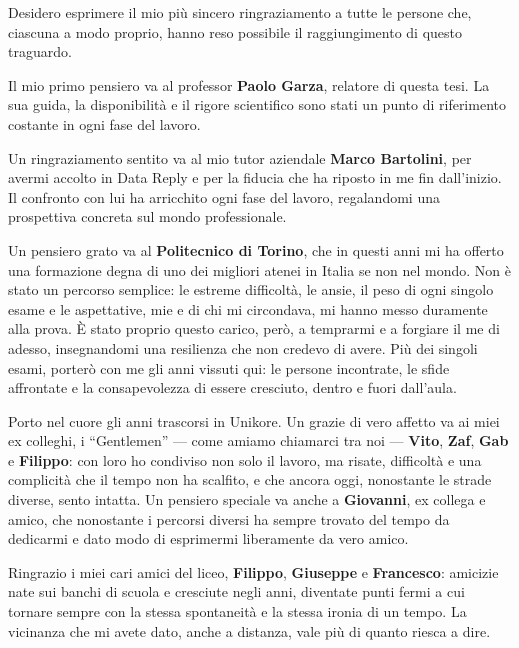 
\begingroup
\setlength{\parindent}{0pt}
\setlength{\parskip}{\baselineskip}

Desidero esprimere il mio più sincero ringraziamento a tutte le persone che, ciascuna a modo proprio, hanno reso possibile il raggiungimento di questo traguardo.

Il mio primo pensiero va al professor \textbf{Paolo Garza}, relatore di questa tesi. La sua guida, la disponibilità e il rigore scientifico sono stati un punto di riferimento costante in ogni fase del lavoro.

Un ringraziamento sentito va al mio tutor aziendale \textbf{Marco Bartolini}, per avermi accolto in Data Reply e per la fiducia che ha riposto in me fin dall'inizio. Il confronto con lui ha arricchito ogni fase del lavoro, regalandomi una prospettiva concreta sul mondo professionale.

Un pensiero grato va al \textbf{Politecnico di Torino}, che in questi anni mi ha offerto una formazione degna di uno dei migliori atenei in Italia se non nel mondo. Non è stato un percorso semplice: le estreme difficoltà, le ansie, il peso di ogni singolo esame e le aspettative, mie e di chi mi circondava, mi hanno messo duramente alla prova. È stato proprio questo carico, però, a temprarmi e a forgiare il me di adesso, insegnandomi una resilienza che non credevo di avere. Più dei singoli esami, porterò con me gli anni vissuti qui: le persone incontrate, le sfide affrontate e la consapevolezza di essere cresciuto, dentro e fuori dall'aula.

Porto nel cuore gli anni trascorsi in Unikore. Un grazie di vero affetto va ai miei ex colleghi, i ``Gentlemen'' --- come amiamo chiamarci tra noi --- \textbf{Vito}, \textbf{Zaf}, \textbf{Gab} e \textbf{Filippo}: con loro ho condiviso non solo il lavoro, ma risate, difficoltà e una complicità che il tempo non ha scalfito, e che ancora oggi, nonostante le strade diverse, sento intatta. Un pensiero speciale va anche a \textbf{Giovanni}, ex collega e amico, che nonostante i percorsi diversi ha sempre trovato del tempo da dedicarmi e dato modo di esprimermi liberamente da vero amico.

Ringrazio i miei cari amici del liceo, \textbf{Filippo}, \textbf{Giuseppe} e \textbf{Francesco}: amicizie nate sui banchi di scuola e cresciute negli anni, diventate punti fermi a cui tornare sempre con la stessa spontaneità e la stessa ironia di un tempo. La vicinanza che mi avete dato, anche a distanza, vale più di quanto riesca a dire.

